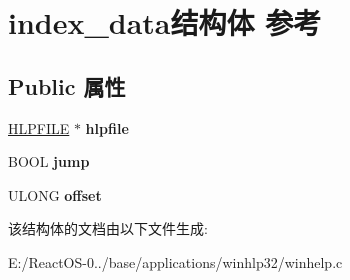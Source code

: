 \hypertarget{structindex__data}{}\section{index\+\_\+data结构体 参考}
\label{structindex__data}
\subsection*{Public 属性}
\begin{DoxyCompactItemize}
\item 
\mbox{\label{structindex__data_a2c995010fc7917cd4eaa9480e6f9e443}} 
\hyperlink{structtag_hlp_file_file}{H\+L\+P\+F\+I\+LE} $\ast$ {\bfseries hlpfile}
\item 
\mbox{\label{structindex__data_a4d03df3c18e460b11f4b5c3d4270b5ae}} 
B\+O\+OL {\bfseries jump}
\item 
\mbox{\label{structindex__data_a54e2a354e497231cbc8fa23f42e54e53}} 
U\+L\+O\+NG {\bfseries offset}
\end{DoxyCompactItemize}


该结构体的文档由以下文件生成\+:\begin{DoxyCompactItemize}
\item 
E\+:/\+React\+O\+S-\/0../base/applications/winhlp32/winhelp.\+c\end{DoxyCompactItemize}
